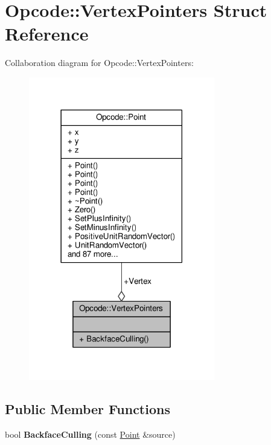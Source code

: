 \hypertarget{structOpcode_1_1VertexPointers}{}\section{Opcode\+:\+:Vertex\+Pointers Struct Reference}
\label{structOpcode_1_1VertexPointers}


Collaboration diagram for Opcode\+:\+:Vertex\+Pointers\+:
\nopagebreak
\begin{figure}[H]
\begin{center}
\leavevmode
\includegraphics[width=230pt]{d5/d9a/structOpcode_1_1VertexPointers__coll__graph}
\end{center}
\end{figure}
\subsection*{Public Member Functions}
\begin{DoxyCompactItemize}
\item 
bool {\bfseries Backface\+Culling} (const \hyperlink{classOpcode_1_1Point}{Point} \&source)\hypertarget{structOpcode_1_1VertexPointers_a7d6ec9b668be375a72ddbcdb3f31007b}{}\label{structOpcode_1_1VertexPointers_a7d6ec9b668be375a72ddbcdb3f31007b}

\end{DoxyCompactItemize}
